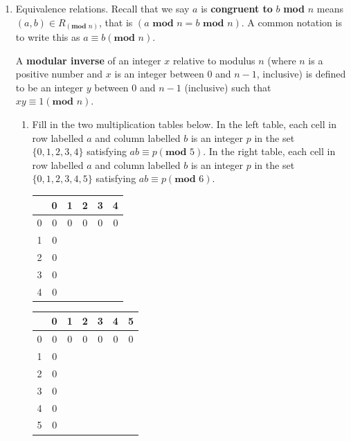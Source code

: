 \begin{enumerate}[labelindent=0pt, leftmargin=0pt]
    \item Equivalence relations.  Recall that we say $a$ is {\bf congruent to} $b$ \textbf{mod} $n$ 
    means $(a, b) \in R_{(\textbf{mod } n)}$, that is $(a \textbf{ mod } n = b \textbf{ mod } n)$.
    A common notation is to write this as $a \equiv b (\textbf{mod } n)$.
    
    A {\bf modular inverse} of an integer $x$ relative to modulus $n$ (where $n$ 
    is a positive number and $x$ is an integer between $0$ and $n-1$, inclusive) 
    is defined to be an integer $y$ between $0$ and $n-1$ (inclusive) such that 
    $xy \equiv 1 (\textbf{mod } n)$.
    \begin{enumerate}
        \item Fill in the two multiplication tables below. In the left table,  each  cell in 
        row labelled $a$ and column labelled $b$ is an integer $p$ in the set $\{0, 1, 2, 3, 4\}$
        satisfying $ab \equiv p ({\textbf{mod } 5})$.
        In the right table, 
        each  cell in 
        row labelled $a$ and column labelled $b$ is an integer $p$ in the set $\{0, 1, 2, 3, 4, 5\}$
        satisfying $ab \equiv p ({\textbf{mod } 6})$.

        \begin{center}
            \begin{tabular}{|c||c|c|c|c|c|}
                \hline
                  & 0 & 1 & 2 & 3 & 4 \\
                  \hline \hline
                0 & 0 & 0 & 0 & 0 & 0 \\
                \hline
                1 & 0 & ~ & ~ & ~ & ~ \\
                \hline
                2 & 0 & ~ & ~ & ~ & ~ \\
                \hline
                3 & 0 & ~ & ~ & ~ & ~ \\
                \hline
                4 & 0 & ~ & ~ & ~ & ~ \\
                \hline
            \end{tabular}
            \hspace{2in}
            \begin{tabular}{|c||c|c|c|c|c|c|}
                \hline
                  & 0 & 1 & 2 & 3 & 4 &5 \\
                  \hline \hline
                0 & 0 & 0 & 0 & 0 & 0 & 0\\
                \hline
                1 & 0 & ~ & ~ & ~ & ~ &\\
                \hline
                2 & 0 & ~ & ~ & ~ & ~ &\\
                \hline
                3 & 0 & ~ & ~ & ~ & ~ &\\
                \hline
                4 & 0 & ~ & ~ & ~ & ~ &\\
                \hline
                5 & 0 & ~ & ~ & ~ & ~ &\\
                \hline
            \end{tabular}
        \end{center}


\end{enumerate}
\end{enumerate}
